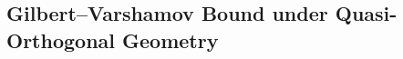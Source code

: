 \documentclass{iopjournal}
\theoremstyle{thmstyleone}%
\theoremstyle{thmstyletwo}%
\theoremstyle{thmstylethree}%
\begin{document}


\subsection{Gilbert–Varshamov Bound under Quasi-Orthogonal Geometry}
\end{document}
